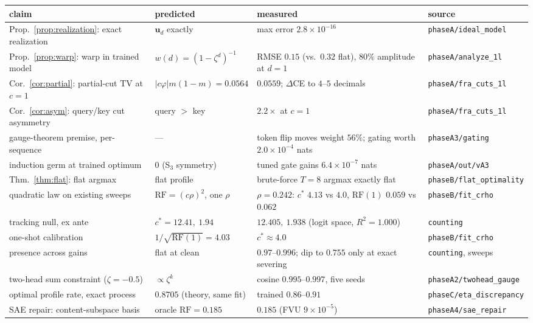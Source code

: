 \documentclass{article}
\newcommand{\ub}{\boldsymbol{u}}
\newcommand{\RF}{\mathrm{RF}}
\theoremstyle{definition}
\begin{document}
\begin{center}
\small
\begin{tabular}{p{4.6cm}p{3.4cm}p{3.4cm}l}
\toprule
claim & predicted & measured & source \\
\midrule
Prop.~\ref{prop:realization}: exact realization & $\ub_d$ exactly &
max error $2.8\times10^{-16}$ & \texttt{phaseA/ideal\_model} \\
Prop.~\ref{prop:warp}: warp in trained model & $w(d) = (1-\zeta^d)^{-1}$ &
RMSE $0.15$ (vs.\ $0.32$ flat), $80\%$ amplitude at $d{=}1$ &
\texttt{phaseA/analyze\_1l} \\
Cor.~\ref{cor:partial}: partial-cut TV at $c{=}1$ & $|c\varphi|m(1{-}m)
= 0.0564$ & $0.0559$; $\Delta$CE to $4$--$5$ decimals &
\texttt{phaseA/fra\_cuts\_1l} \\
Cor.~\ref{cor:asym}: query/key cut asymmetry & query $>$ key &
$2.2\times$ at $c{=}1$ & \texttt{phaseA/fra\_cuts\_1l} \\
gauge-theorem premise, per-sequence & --- & token flip moves weight $56\%$;
gating worth $2.0\times10^{-4}$ nats & \texttt{phaseA3/gating} \\
induction germ at trained optimum & $0$ (S$_3$ symmetry) & tuned gate gains
$6.4\times10^{-7}$ nats & \texttt{phaseA/out/vA3} \\
Thm.~\ref{thm:flat}: flat argmax & flat profile & brute-force $T{=}8$ argmax
exactly flat & \texttt{phaseB/flat\_optimality} \\
quadratic law on existing sweeps & $\RF = (c\rho)^2$, one $\rho$ &
$\rho = 0.242$: $c^\ast$ $4.13$ vs $4.0$, $\RF(1)$ $0.059$ vs $0.062$ &
\texttt{phaseB/fit\_crho} \\
tracking null, ex ante & $c^\ast = 12.41,\ 1.94$ & $12.405,\ 1.938$
(logit space, $R^2 = 1.000$) & \texttt{counting} \\
one-shot calibration & $1/\sqrt{\RF(1)} = 4.03$ & $c^\ast \approx 4.0$ &
\texttt{phaseB/fit\_crho} \\
presence across gains & flat at clean & $0.97$--$0.996$; dip to $0.755$
only at exact severing & \texttt{counting}, sweeps \\
two-head sum constraint ($\zeta = -0.5$) & $\propto \zeta^k$ & cosine
$0.995$--$0.997$, five seeds & \texttt{phaseA2/twohead\_gauge} \\
optimal profile rate, exact process & $0.8705$ (theory, same fit) &
trained $0.86$--$0.91$ & \texttt{phaseC/eta\_discrepancy} \\
SAE repair: content-subspace basis & oracle $\RF = 0.185$ & $0.185$
(FVU $9{\times}10^{-5}$) & \texttt{phaseA4/sae\_repair} \\
\bottomrule
\end{tabular}
\end{center}
\end{document}
